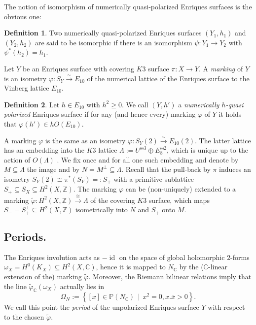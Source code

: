 \documentclass{amsart}
\theoremstyle{definition}
\newtheorem{definition}{Definition}[section]
\theoremstyle{plain}
\DeclareMathOperator{\id}{id}
\newcommand{\CC}{\mathbb{C}}
\newcommand{\ZZ}{\mathbb{Z}}
\newcommand{\PP}{\mathbb{P}}
\begin{document}
The notion of isomorphism of numerically quasi-polarized Enriques surfaces is the obvious one:
\begin{definition}
    Two numerically quasi-polarized Enriques surfaces $(Y_1,h_1)$ and $(Y_2,h_2)$  are said to be isomorphic if there is an isomorphism $\psi\colon Y_1 \to Y_2$ with $\psi^*(h_2) = h_1$.
\end{definition}
Let $Y$ be an Enriques surface with covering $K3$ surface $\pi\colon X\to Y$.
A \emph{marking} of $Y$ is an isometry $\varphi\colon S_Y\xrightarrow{\sim} E_{10}$ of the numerical lattice of the Enriques surface to the Vinberg lattice $E_{10}$.

\begin{definition}
Let $h \in E_{10}$ with $h^2\geq 0$. We call $(Y,h')$ a \emph{numerically $h$-quasi polarized} Enriques surface if for any (and hence every) marking $\varphi$ of $Y$ it holds that $\varphi(h') \in hO(E_{10})$.
\end{definition}

A marking $\varphi$ is the same as an isometry $\varphi\colon S_Y\left(2\right)\xrightarrow{\sim} E_{10}\left(2\right)$. The latter lattice has an embedding into the $K3$ lattice $\Lambda:=U^{\oplus 3}\oplus E_8^{\oplus 2}$, which is unique up to the action of \(O(\Lambda)\) \cite[Theorem 1.14.4]{nikulin}. We fix once and for all one such embedding and denote by $M\subseteq \Lambda$ the image and by $N=M^{\perp}\subseteq\Lambda$.
Recall that the pull-back by $\pi$ induces an isometry $S_Y(2)\cong\pi^*\left(S_Y\right)=:S_+$ with a primitive sublattice $S_+\subseteq S_X\subseteq H^2\left(X,\ZZ\right)$.
The marking $\varphi$ can be (non-uniquely) extended to a marking $\tilde{\varphi}\colon H^2\left(X,\ZZ\right)\stackrel{\cong}{\to}\Lambda$ of the covering $K3$ surface, which maps $S_- = S_+^{\perp}\subseteq H^2\left(X,\ZZ\right)$ isometrically into $N$ and $S_+$ onto $M$.

\subsection*{Periods.}
The Enriques involution acts as $-\id$ on the space of global holomorphic $2$-forms $\omega_X=H^0\left(K_X\right)\subseteq H^2\left(X,\CC\right)$, hence it is mapped to $N_{\CC}$ by the ($\CC$-linear extension of the) marking $\widetilde{\varphi}$. Moreover, the Riemann bilinear relations imply that the line $\widetilde{\varphi}_{\CC}\left(\omega_X\right)$ actually lies in
$$\Omega_N:=\left\{\left[x\right]\in\PP\left(N_{\CC}\right)\,\mid\,x^2=0, x.\overline{x}>0\right\}.$$
We call this point the \emph{period} of the unpolarized Enriques surface $Y$ with respect to the chosen $\widetilde{\varphi}$.
\end{document}
